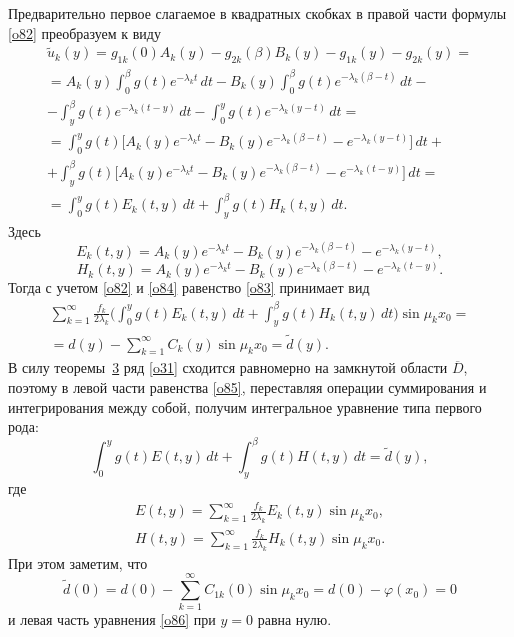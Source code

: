 Предварительно первое слагаемое в квадратных скобках в правой части формулы \eqref{o82} преобразуем к виду
\begin{multline}
\widetilde{u}_k(y)=g_{1k}(0)A_k(y)-g_{2k}(\beta)B_k(y)-g_{1k}(y)-g_{2k}(y)=
\\
=A_k(y)\int _{0}^{\beta}g(t)e^{-\lambda_kt}\,dt-B_k(y)\int _{0}^{\beta}g(t)e^{-\lambda_k(\beta-t)}\,dt-
\\
-\int _{y}^{\beta}g(t)e^{-\lambda_k(t-y)}\,dt-\int _{0}^{y}g(t)e^{-\lambda_k(y-t)}\,dt=
\\
=\int _{0}^{y}g(t)\bigl[A_k(y)e^{-\lambda_kt}-B_k(y)e^{-\lambda_k(\beta-t)}-e^{-\lambda_k(y-t)}\bigr]\,dt+
\\
+\int _{y}^{\beta}g(t)\bigl[A_k(y)e^{-\lambda_kt}-B_k(y)e^{-\lambda_k(\beta-t)}-e^{-\lambda_k(t-y)}\bigr]\,dt=
\\
\label{o84}
=\int _{0}^{y}g(t)E_k(t,y)\,dt+\int _{y}^{\beta}g(t)H_k(t,y)\,dt.
\end{multline}
Здесь
$$
E_k(t,y)=A_k(y)e^{-\lambda_kt}-B_k(y)e^{-\lambda_k(\beta-t)}-e^{-\lambda_k(y-t)},
$$
$$
H_k(t,y)=A_k(y)e^{-\lambda_kt}-B_k(y)e^{-\lambda_k(\beta-t)}-e^{-\lambda_k(t-y)}.
$$
Тогда с учетом \eqref{o82} и \eqref{o84} равенство \eqref{o83} принимает вид
\begin{multline}
\sum\limits_{k=1}^{\infty}\frac{f_k}{2\lambda_k}
\biggl(\int _{0}^{y}g(t)E_k(t,y)\,dt+ \int _{y}^{\beta}g(t)H_k(t,y)\,dt\biggr)\sin\mu_kx_0=
\\
\label{o85}
=d(y)- \sum\limits_{k=1}^{\infty}C_k(y)\sin\mu_kx_0=\widetilde{d}(y).
\end{multline}
В силу теоремы~\hyperlink{sab:th3}{3} ряд \eqref{o31} сходится равномерно на замкнутой области $\overline{D}$, поэтому в левой части равенства \eqref{o85}, переставляя операции суммирования и интегрирования между собой, получим интегральное уравнение типа первого рода:
\begin{equation}\label{o86}
\int _{0}^{y}g(t)E(t,y)\,dt+\int _{y}^{\beta}g(t)H(t,y)\,dt=\widetilde{d}(y),
\end{equation}
где
\begin{gather}\label{o87}
E(t,y)=\sum\limits_{k=1}^{\infty}\frac{f_k}{2\lambda_k}E_k(t,y)\sin\mu_kx_0,
\\
\label{o88}
H(t,y)=\sum\limits_{k=1}^{\infty}\frac{f_k}{2\lambda_k}H_k(t,y)\sin\mu_kx_0.
\end{gather}
При этом заметим, что
$$
\widetilde{d}(0)=d(0)-\sum\limits_{k=1}^{\infty}C_{1k}(0)\sin\mu_kx_0=d(0)-\varphi(x_0)=0
$$
и левая часть уравнения \eqref{o86} при $y=0$ равна нулю.

